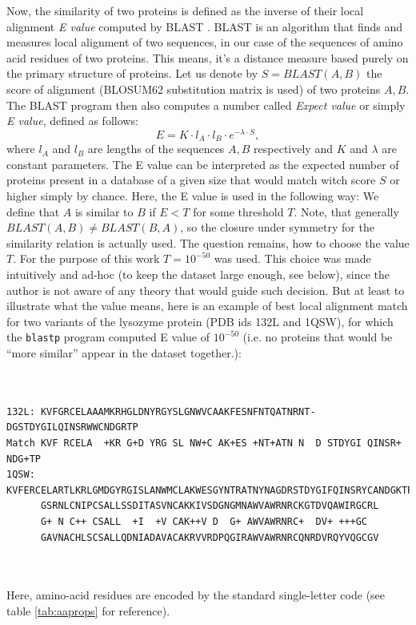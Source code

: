 \documentclass[11pt,twoside,a4paper]{book}
\begin{document}
Now, the similarity of two proteins is defined as the inverse of their local alignment \emph{E value} computed by BLAST \cite{blast} \cite{blastp}.
BLAST is an algorithm that finds and measures local alignment of two sequences,
in our case of the sequences of amino acid residues of two proteins. 
This means, it's a distance measure based purely on the primary structure of proteins.
Let us denote by $S = BLAST(A,B)$ the score of alignment (BLOSUM62 substitution matrix is used) 
of two proteins $A, B$.
The BLAST program then also computes a number called \emph{Expect value} or simply \emph{E value}, 
defined as follows:
\[ E = K \cdot l_A \cdot l_B \cdot e^{-\lambda \cdot S}, \]
where $l_A$ and $l_B$ are lengths of the sequences $A,B$ respectively and $K$ and $\lambda$ are constant parameters.
The E value can be interpreted as the expected number of proteins present in a database of a given size
that would match witch score $S$ or higher simply by chance.
Here, the E value is used in the following way: We define that $A$ is similar to $B$ if $E < T$ for some threshold $T$.
Note, that generally $BLAST(A,B) \neq BLAST(B,A)$,
so the closure under symmetry for the similarity relation is actually used.
The question remains, how to choose the value $T$.
For the purpose of this work $T = 10^{-50}$ was used.
This choice was made intuitively and ad-hoc (to keep the dataset large enough, see below),
since the author is not aware of any theory that would guide such decision.
But at least to illustrate what the value means, here is an example of best local alignment match
for two variants of the lysozyme protein (PDB ids 132L and 1QSW), for which the \texttt{blastp} program computed E value of $10^{-50}$
(i.e. no proteins that would be ``more similar'' appear in the dataset together.):
\begin{minipage}{\linewidth}
\begin{verbatim}


132L: KVFGRCELAAAMKRHGLDNYRGYSLGNWVCAAKFESNFNTQATNRNT-DGSTDYGILQINSRWWCNDGRTP
Match KVF RCELA  +KR G+D YRG SL NW+C AK+ES +NT+ATN N  D STDYGI QINSR+  NDG+TP
1QSW: KVFERCELARTLKRLGMDGYRGISLANWMCLAKWESGYNTRATNYNAGDRSTDYGIFQINSRYCANDGKTP
      GSRNLCNIPCSALLSSDITASVNCAKKIVSDGNGMNAWVAWRNRCKGTDVQAWIRGCRL
      G+ N C++ CSALL  +I  +V CAK++V D  G+ AWVAWRNRC+  DV+ +++GC
      GAVNACHLSCSALLQDNIADAVACAKRVVRDPQGIRAWVAWRNRCQNRDVRQYVQGCGV
      
      
\end{verbatim}
\end{minipage}
Here, amino-acid residues are encoded by the standard single-letter code (see table \ref{tab:aaprops} for reference). 
\end{document}
